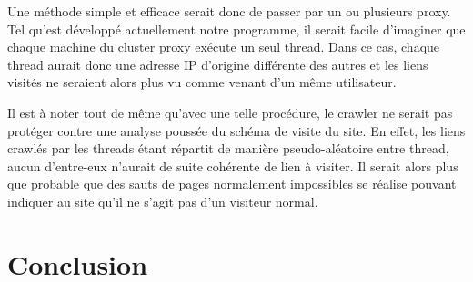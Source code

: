 \documentclass[hideweeklyreports,noposter]{polytech/polytech}
\begin{document}
	    Une méthode simple et efficace serait donc de passer par un ou plusieurs proxy.
	    Tel qu'est développé actuellement notre programme, il serait facile d'imaginer que chaque machine du cluster proxy exécute un seul thread.
	    Dans ce cas, chaque thread aurait donc une adresse IP d'origine différente des autres et les liens visités ne seraient alors plus vu comme venant d'un même utilisateur.
	    
	    
	    Il est à noter tout de même qu'avec une telle procédure, le crawler ne serait pas protéger contre une analyse poussée du schéma de visite du site.
	    En effet, les liens crawlés par les threads étant répartit de manière pseudo-aléatoire entre thread, aucun d'entre-eux n'aurait de suite cohérente de lien à visiter.
	    Il serait alors plus que probable que des sauts de pages normalement impossibles se réalise pouvant indiquer au site qu'il ne s'agit pas d'un visiteur normal.
		

\part{Conclusion}

\appendix		
\end{document}
